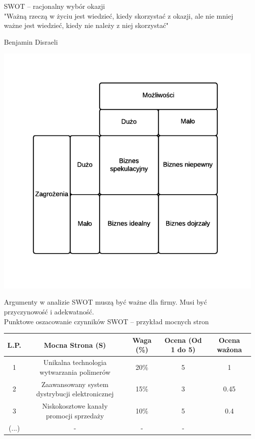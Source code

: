 \documentclass[a4paper,10pt]{report}
\begin{document}
SWOT -- racjonalny wybór okazji \\

"Ważną rzeczą w życiu jest wiedzieć, kiedy skorzystać z okazji, ale nie mniej ważne jest wiedzieć, kiedy nie należy z niej skorzystać"
\begin{flushright}
Benjamin Disraeli
\end{flushright}

\begin{center}
\includegraphics[scale=0.87]{assets/SWOT2}
\end{center}

Argumenty w analizie SWOT muszą być ważne dla firmy. Musi być przyczynowość i adekwatność.
\\

Punktowe oszacowanie czynników SWOT -- przykład mocnych stron \\
\begin{tabular}{| c | c | c| c | c |}
\hline
L.P. & Mocna Strona (S) & Waga (\%) & Ocena (Od 1 do 5) & Ocena ważona \\ \hline
1 & Unikalna technologia wytwarzania polimerów & 20\% & 5 & 1 \\ \hline
2 & Zaawansowany system dystrybucji elektronicznej & 15\% & 3 & 0.45 \\ \hline
3 & Niskokosztowe kanały promocji sprzedaży & 10\% & 5 & 0.4 \\ \hline
(...) & - & - & - & \\ \hline

\end{tabular}
\end{document}
